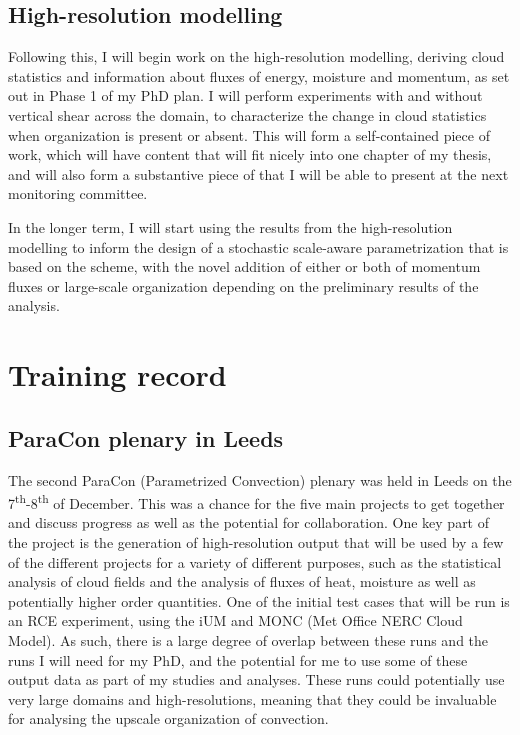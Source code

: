 \documentclass[11pt,a4paper]{article}
\newcommand{\ts}{\textsuperscript}
\begin{document}
\subsection{High-resolution modelling}
\label{sec:high_res_modelling}
Following this, I will begin work on the high-resolution modelling, deriving cloud statistics and information about fluxes of energy, moisture and momentum, as set out in Phase 1 of my PhD plan. I will perform experiments with and without vertical shear across the domain, to characterize the change in cloud statistics when organization is present or absent. This will form a self-contained piece of work, which will have content that will fit nicely into one chapter of my thesis, and will also form a substantive piece of that I will be able to present at the next monitoring committee.

In the longer term, I will start using the results from the high-resolution modelling to inform the design of a stochastic scale-aware parametrization that is based on the \cite{plant2008stochastic} scheme, with the novel addition of either or both of momentum fluxes or large-scale organization depending on the preliminary results of the analysis.

\section{Training record}

\subsection{ParaCon plenary in Leeds}
\label{sec:paracon_plenary}
The second ParaCon (Parametrized Convection) plenary was held in Leeds on the 7\ts{th}-8\ts{th} of December. This was a chance for the five main projects to get together and discuss progress as well as the potential for collaboration. One key part of the project is the generation of high-resolution output that will be used by a few of the different projects for a variety of different purposes, such as the statistical analysis of cloud fields and the analysis of fluxes of heat, moisture as well as potentially higher order quantities. One of the initial test cases that will be run is an RCE experiment, using the iUM and MONC (Met Office NERC Cloud Model). As such, there is a large degree of overlap between these runs and the runs I will need for my PhD, and the potential for me to use some of these output data as part of my studies and analyses. These runs could potentially use very large domains and high-resolutions, meaning that they could be invaluable for analysing the upscale organization of convection.
\end{document}
